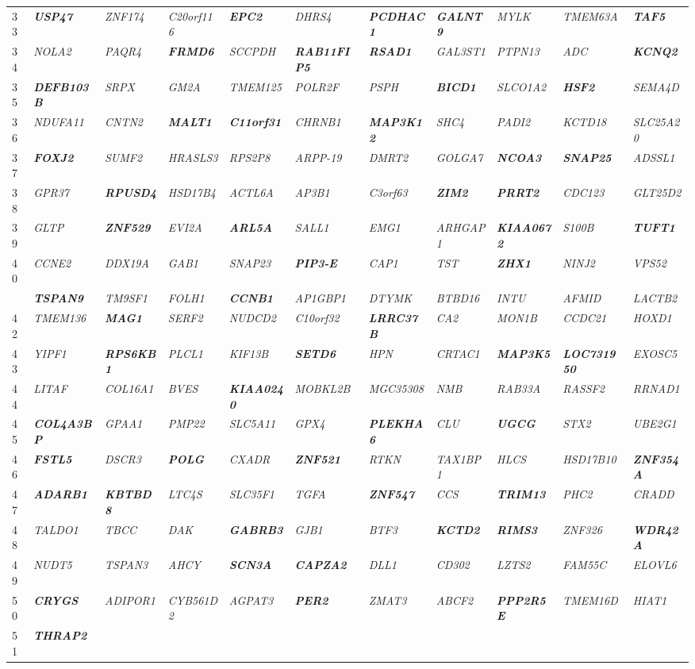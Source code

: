\documentclass[letterpaper,12pt]{article}
\numberwithin{equation}{appendix}
\begin{document}
\begin{landscape}
{{\begin{longtable}{l >{\itshape}l >{\itshape}l >{\itshape}l >{\itshape}l >{\itshape}l >{\itshape}l >{\itshape}l >{\itshape}l >{\itshape}l >{\itshape}l}
33&{\bfseries {USP47}}&ZNF174&C20orf116&{\bfseries {EPC2}}&DHRS4&{\bfseries {PCDHAC1}}&{\bfseries {GALNT9}}&MYLK&TMEM63A&{\bfseries {TAF5}}\tabularnewline
34&NOLA2&PAQR4&{\bfseries {FRMD6}}&SCCPDH&{\bfseries {RAB11FIP5}}&{\bfseries {RSAD1}}&GAL3ST1&PTPN13&ADC&{\bfseries {KCNQ2}}\tabularnewline
35&{\bfseries {DEFB103B}}&SRPX&GM2A&TMEM125&POLR2F&PSPH&{\bfseries {BICD1}}&SLCO1A2&{\bfseries {HSF2}}&SEMA4D\tabularnewline
36&NDUFA11&CNTN2&{\bfseries {MALT1}}&{\bfseries {C11orf31}}&CHRNB1&{\bfseries {MAP3K12}}&SHC4&PADI2&KCTD18&SLC25A20\tabularnewline
37&{\bfseries {FOXJ2}}&SUMF2&HRASLS3&RPS2P8&ARPP-19&DMRT2&GOLGA7&{\bfseries {NCOA3}}&{\bfseries {SNAP25}}&ADSSL1\tabularnewline
38&GPR37&{\bfseries {RPUSD4}}&HSD17B4&ACTL6A&AP3B1&C3orf63&{\bfseries {ZIM2}}&{\bfseries {PRRT2}}&CDC123&GLT25D2\tabularnewline
39&GLTP&{\bfseries {ZNF529}}&EVI2A&{\bfseries {ARL5A}}&SALL1&EMG1&ARHGAP1&{\bfseries {KIAA0672}}&S100B&{\bfseries {TUFT1}}\tabularnewline
40&CCNE2&DDX19A&GAB1&SNAP23&{\bfseries {PIP3-E}}&CAP1&TST&{\bfseries {ZHX1}}&NINJ2&VPS52\tabularnewline
\newpage
41&{\bfseries {TSPAN9}}&TM9SF1&FOLH1&{\bfseries {CCNB1}}&AP1GBP1&DTYMK&BTBD16&INTU&AFMID&LACTB2\tabularnewline
42&TMEM136&{\bfseries {MAG1}}&SERF2&NUDCD2&C10orf32&{\bfseries {LRRC37B}}&CA2&MON1B&CCDC21&HOXD1\tabularnewline
43&YIPF1&{\bfseries {RPS6KB1}}&PLCL1&KIF13B&{\bfseries {SETD6}}&HPN&CRTAC1&{\bfseries {MAP3K5}}&{\bfseries {LOC731950}}&EXOSC5\tabularnewline
44&LITAF&COL16A1&BVES&{\bfseries {KIAA0240}}&MOBKL2B&MGC35308&NMB&RAB33A&RASSF2&RRNAD1\tabularnewline
45&{\bfseries {COL4A3BP}}&GPAA1&PMP22&SLC5A11&GPX4&{\bfseries {PLEKHA6}}&CLU&{\bfseries {UGCG}}&STX2&UBE2G1\tabularnewline
46&{\bfseries {FSTL5}}&DSCR3&{\bfseries {POLG}}&CXADR&{\bfseries {ZNF521}}&RTKN&TAX1BP1&HLCS&HSD17B10&{\bfseries {ZNF354A}}\tabularnewline
47&{\bfseries {ADARB1}}&{\bfseries {KBTBD8}}&LTC4S&SLC35F1&TGFA&{\bfseries {ZNF547}}&CCS&{\bfseries {TRIM13}}&PHC2&CRADD\tabularnewline
48&TALDO1&TBCC&DAK&{\bfseries {GABRB3}}&GJB1&BTF3&{\bfseries {KCTD2}}&{\bfseries {RIMS3}}&ZNF326&{\bfseries {WDR42A}}\tabularnewline
49&NUDT5&TSPAN3&AHCY&{\bfseries {SCN3A}}&{\bfseries {CAPZA2}}&DLL1&CD302&LZTS2&FAM55C&ELOVL6\tabularnewline
50&{\bfseries {CRYGS}}&ADIPOR1&CYB561D2&AGPAT3&{\bfseries {PER2}}&ZMAT3&ABCF2&{\bfseries {PPP2R5E}}&TMEM16D&HIAT1\tabularnewline
51&{\bfseries {THRAP2}}&&&&&&&&&\tabularnewline
\bottomrule
\end{longtable}

}}

{\scriptsize {

}}
\end{landscape}
\end{document}
